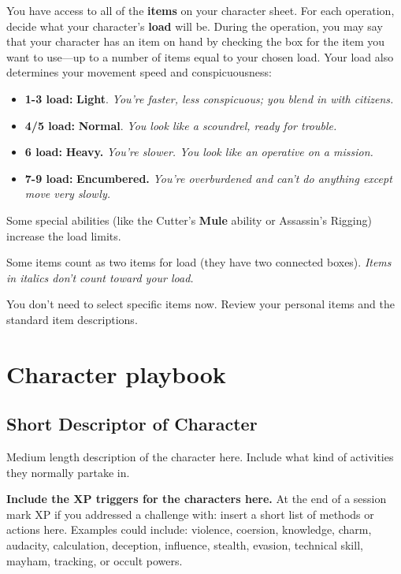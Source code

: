 \documentclass[11pt,fleqn,a5paper]{book}
\newcommand{\gameterm}[1]{\textbf{#1}}
\begin{document}
You have access to all of the \textbf{items} on your character sheet. For each operation, decide what your character’s \textbf{load} will be. During the operation, you may say that your character has an item on hand by checking the box for the item you want to use---up to a number of items equal to your chosen load. Your load also determines your movement speed and conspicuousness:

\begin{itemize}
	\item \gameterm{1-3 load:} \textbf{Light}. \emph{You’re faster, less conspicuous; you blend in with citizens.}
	\item \gameterm{4/5 load: } \textbf{Normal}. \emph{You look like a scoundrel, ready for trouble.}
	\item \gameterm{6 load: } \textbf{Heavy.} \emph{You’re slower. You look like an operative on a mission.}
	\item \gameterm{7-9 load: } \textbf{Encumbered.} \emph{You’re overburdened and can’t do anything except move very slowly.}
\end{itemize}

Some special abilities (like the Cutter’s \gameterm{Mule}  ability or Assassin’s Rigging) increase the load limits.

Some items count as two items for load (they have two connected boxes). \emph{Items in italics don’t count toward your load.}

You don’t need to select specific items now.  Review your personal items and the standard item descriptions.

\chapter{Character playbook}

\section{Short Descriptor of Character}

Medium length description of the character here. Include what kind of activities they normally partake in.

\textbf{Include the XP triggers for the characters here.} At the end of a session mark XP if you addressed a challenge with: insert a short list of methods or actions here. Examples could include: violence, coersion, knowledge, charm, audacity, calculation, deception, influence, stealth, evasion, technical skill, mayham, tracking, or occult powers.
\end{document}
